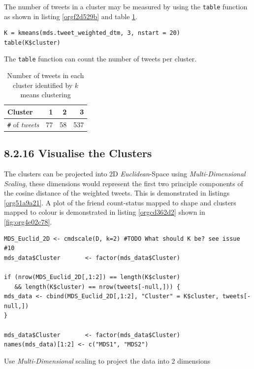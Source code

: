 \documentclass[11pt]{article}
\begin{document}
The number of tweets in a cluster may be measured by using the \texttt{table} function
as shown in listing \ref{orgf2d529b} and table \ref{tab:org408f4de}.

\begin{listing}[htbp]
\begin{verbatim}
K = kmeans(mds.tweet_weighted_dtm, 3, nstart = 20)
table(K$cluster)
\end{verbatim}
\caption{\label{orgf2d529b}The \texttt{table} function can count the number of tweets per cluster.}
\end{listing}

\begin{table}[htbp]
\caption{\label{tab:org408f4de}Number of tweets in each cluster identified by \(k\) means clustering}
\centering
\begin{tabular}{lrrr}
Cluster & 1 & 2 & 3\\
\hline
\texttt{\#} of \emph{tweets} & 77 & 58 & 537\\
\end{tabular}
\end{table}

\subsection{8.2.16 Visualise the Clusters}
\label{sec:orgd0477cf}
The clusters can be projected into 2D \emph{Euclidean}-Space using \emph{Multi-Dimensional
Scaling}, these dimensions would represent the first two principle components of
the cosine distance of the weighted tweets. This is demonstrated in listings
\ref{org51a9a21}. A plot of the friend count-status mapped to shape and clusters mapped to
colour is demonstrated in listing \ref{orgcd362d2} shown in \ref{fig:org4e02c78}.

\begin{listing}[htbp]
\begin{verbatim}
MDS_Euclid_2D <- cmdscale(D, k=2) #TODO What should K be? see issue #10
mds_data$Cluster       <- factor(mds_data$Cluster)

if (nrow(MDS_Euclid_2D[,1:2]) == length(K$cluster)
   && length(K$cluster) == nrow(tweets[-null,])) {
mds_data <- cbind(MDS_Euclid_2D[,1:2], "Cluster" = K$cluster, tweets[-null,])
}

mds_data$Cluster       <- factor(mds_data$Cluster)
names(mds_data)[1:2] <- c("MDS1", "MDS2")
\end{verbatim}
\caption{\label{org51a9a21}Use \emph{Multi-Dimensional} scaling to project the data into 2 dimensions}
\end{listing}
\end{document}
